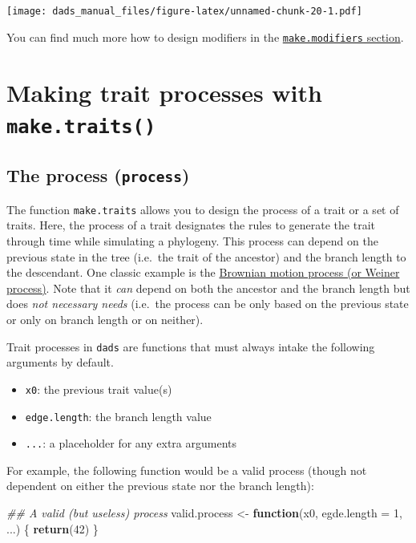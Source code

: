 \documentclass[]{book}
\newenvironment{Shaded}{\begin{snugshade}}{\end{snugshade}}
\newcommand{\CommentTok}[1]{\textcolor[rgb]{0.56,0.35,0.01}{\textit{#1}}}
\newcommand{\ControlFlowTok}[1]{\textcolor[rgb]{0.13,0.29,0.53}{\textbf{#1}}}
\newcommand{\DataTypeTok}[1]{\textcolor[rgb]{0.13,0.29,0.53}{#1}}
\newcommand{\DecValTok}[1]{\textcolor[rgb]{0.00,0.00,0.81}{#1}}
\newcommand{\KeywordTok}[1]{\textcolor[rgb]{0.13,0.29,0.53}{\textbf{#1}}}
\newcommand{\NormalTok}[1]{#1}
\newcommand{\StringTok}[1]{\textcolor[rgb]{0.31,0.60,0.02}{#1}}
\providecommand{\tightlist}{%
  \setlength{\itemsep}{0pt}\setlength{\parskip}{0pt}}
\begin{document}
\texttt{[image: dads\_manual\_files/figure-latex/unnamed-chunk-20-1.pdf]}

You can find much more how to design modifiers in the \protect\hyperlink{makemodifiers}{\texttt{make.modifiers} section}.

\hypertarget{maketraits}{%
\chapter{\texorpdfstring{Making trait processes with \texttt{make.traits()}}{Making trait processes with make.traits()}}\label{maketraits}}

\hypertarget{the-process-process}{%
\section{\texorpdfstring{The process (\texttt{process})}{The process (process)}}\label{the-process-process}}

The function \texttt{make.traits} allows you to design the process of a trait or a set of traits.
Here, the process of a trait designates the rules to generate the trait through time while simulating a phylogeny.
This process can depend on the previous state in the tree (i.e.~the trait of the ancestor) and the branch length to the descendant.
One classic example is the \href{https://en.wikipedia.org/wiki/Brownian_motion}{Brownian motion process (or Weiner process)}.
Note that it \emph{can} depend on both the ancestor and the branch length but does \emph{not necessary needs} (i.e.~the process can be only based on the previous state or only on branch length or on neither).

Trait processes in \texttt{dads} are functions that must always intake the following arguments by default.

\begin{itemize}
\tightlist
\item
  \texttt{x0}: the previous trait value(s)
\item
  \texttt{edge.length}: the branch length value
\item
  \texttt{...}: a placeholder for any extra arguments
\end{itemize}

For example, the following function would be a valid process (though not dependent on either the previous state nor the branch length):

\begin{Shaded}
\begin{Highlighting}[]
\CommentTok{## A valid (but useless) process}
\NormalTok{valid.process <-}\StringTok{ }\ControlFlowTok{function}\NormalTok{(x0, }\DataTypeTok{egde.length =} \DecValTok{1}\NormalTok{, ...) \{}
    \KeywordTok{return}\NormalTok{(}\DecValTok{42}\NormalTok{)}
\NormalTok{\}}
\end{Highlighting}
\end{Shaded}
\end{document}
